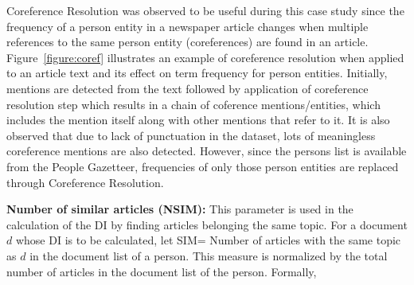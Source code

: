 Coreference Resolution was observed to be useful during this case study since the frequency of a person entity in a newspaper article changes when multiple references to the same person entity (coreferences) are found in an article. Figure~\ref{figure:coref}  illustrates an example of coreference resolution when applied to an article text and its effect on term frequency for person entities. Initially, mentions are detected from the text followed by application of coreference resolution step which results in a chain of coference mentions/entities, which includes the mention itself along with other mentions that refer to it. It is also observed that due to lack of punctuation in the dataset, lots of meaningless coreference mentions are also detected. However, since the persons list is available from the People Gazetteer, frequencies of only those person entities are replaced through Coreference Resolution. 

\begin{figure*}
\caption{Figure illustrating change in term frequency for person named entities on using coreference resolution on an article text}
\label{figure:coref}
\end{figure*}

\noindent \textbf{Number of similar articles (NSIM): }
This parameter is used in the calculation of the DI by finding articles belonging the same topic. 
For a document $d$ whose DI is to be calculated, let  SIM= Number of articles with the same topic as $d$ in the document list of a person.
This measure is normalized by the total number of articles in the document list of the person. Formally,

